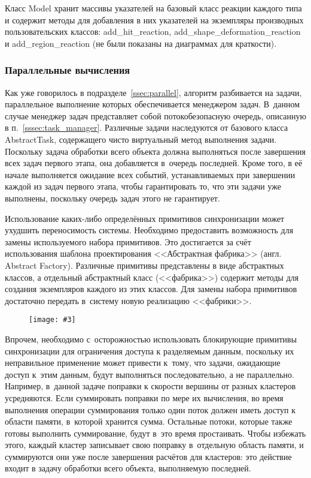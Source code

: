 \documentclass[a4paper, 14pt, titlepage]{extarticle}
\newcommand{\eng}[1]{{\English #1}}
\newenvironment{myfigure}[2]%
    {\pushQED{\caption{#1} \label{#2}} %
     \begin{figure}[!htb]\centering } %
    {  \popQED %
     \end{figure}}
\newcommand{\includefigure}[3][]{
    \begin{myfigure}{#2}{fig:#3}
      \texttt{[image: \#3]}
    \end{myfigure}
  }
\begin{document}
        Класс Model хранит массивы указателей на базовый класс реакции каждого типа и содержит
        методы для добавления в них указателей на экземпляры производных пользовательских классов:
        add\_hit\_reaction, add\_shape\_deformation\_reaction и add\_region\_reaction (не были
        показаны на диаграммах для краткости).

      \subsubsection{Параллельные вычисления}

        Как уже говорилось в подразделе~\ref{ssec:parallel}, алгоритм разбивается на задачи, параллельное
        выполнение которых обеспечивается менеджером задач. В~данном случае менеджер задач представляет собой
        потокобезопасную очередь, описанную в п.~\ref{sssec:task_manager}. Различные задачи
        наследуются от базового класса AbstractTask, содержащего чисто виртуальный метод выполнения
        задачи.  Поскольку задача обработки всего объекта должна выполняться после завершения всех
        задач первого этапа, она добавляется в~очередь последней. Кроме того, в её начале
        выполняется ожидание всех событий, устанавливаемых при завершении каждой из задач первого
        этапа, чтобы гарантировать то, что эти задачи уже выполнены, поскольку очередь задач этого не гарантирует.

        Использование каких-либо определённых примитивов синхронизации может ухудшить переносимость
        системы. Необходимо предоставить возможность для замены используемого набора примитивов.
        Это достигается за счёт использования шаблона проектирования <<Абстрактная фабрика>> (англ. \eng{Abstract
        Factory}). Различные примитивы представлены в виде абстрактных классов, а отдельный
        абстрактный класс (<<фабрика>>) содержит методы для создания экземпляров каждого из этих
        классов. Для замены набора примитивов достаточно передать в~систему новую реализацию
        <<фабрики>>.

        \includefigure{абстрактная фабрика примитивов синхронизации.}{parallel}

        Впрочем, необходимо с~осторожностью использовать блокирующие примитивы синхронизации для
        ограничения доступа к разделяемым данным, поскольку их неправильное применение может
        привести к~тому, что задачи, ожидающие доступ к~этим данным, будут выполняться
        последовательно, а не параллельно.  Например, в~данной задаче поправки к скорости вершины от
        разных кластеров усредняются. Если суммировать поправки по мере их вычисления, во время
        выполнения операции суммирования только один поток должен иметь доступ к области памяти,
        в~которой хранится сумма. Остальные потоки, которые также готовы выполнить суммирование,
        будут в~это время простаивать. Чтобы избежать этого, каждый кластер записывает свою поправку
        в~отдельную область памяти, и суммируются они уже после завершения расчётов для кластеров:
        это действие входит в задачу обработки всего объекта, выполняемую последней.
\end{document}
